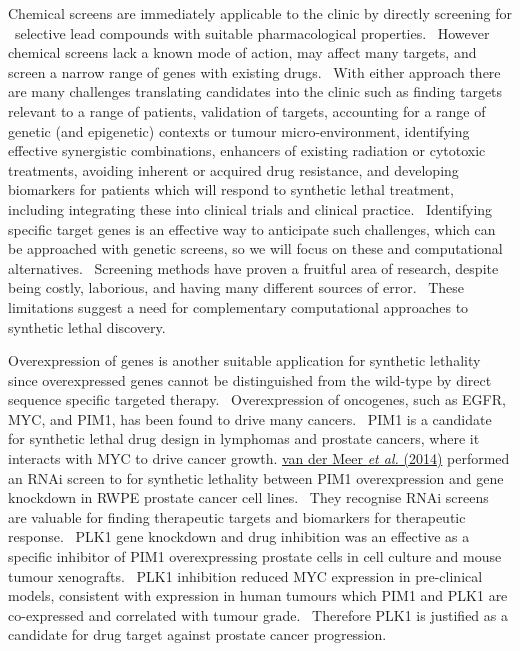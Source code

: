 Chemical screens are immediately applicable to the clinic by directly screening for \ selective lead compounds with suitable pharmacological properties. \ However chemical screens lack a known mode of action, may affect many targets, and screen a narrow range of genes with existing drugs. \ With either approach there are many challenges translating candidates into the clinic such as finding targets relevant to a range of patients, validation of targets, accounting for a range of genetic (and epigenetic) contexts or tumour micro-environment, identifying effective synergistic combinations, enhancers of existing radiation or cytotoxic treatments, avoiding inherent or acquired drug resistance, and developing biomarkers for patients which will respond to synthetic lethal treatment, including integrating these into clinical trials and clinical practice. \ Identifying specific target genes is an effective way to anticipate such challenges, which can be approached with genetic screens, so we will focus on these and computational alternatives. \ Screening methods have proven a fruitful area of research, despite being costly, laborious, and having many different sources of error. \ These limitations suggest a need for complementary computational approaches to synthetic lethal discovery. \  


Overexpression of genes is another suitable application for synthetic lethality since overexpressed genes cannot be distinguished from the wild-type by direct sequence specific targeted therapy. \ Overexpression of oncogenes, such as EGFR, MYC, and PIM1, has been found to drive many cancers. \ PIM1 is a candidate for synthetic lethal drug design in lymphomas and prostate cancers, where it interacts with MYC to drive cancer growth. \hyperlink{ENREF103}{van der Meer}\hyperlink{ENREF103}{\textit{ et al.}}\hyperlink{ENREF103}{ (2014)} performed an RNAi screen to for synthetic lethality between PIM1 overexpression and gene knockdown in RWPE prostate cancer cell lines. \ They recognise RNAi screens are valuable for finding therapeutic targets and biomarkers for therapeutic response. \ PLK1 gene knockdown and drug inhibition was an effective as a specific inhibitor of PIM1 overexpressing prostate cells in cell culture and mouse tumour xenografts. \ PLK1 inhibition reduced MYC expression in pre-clinical models, consistent with expression in human tumours which PIM1 and PLK1 are co-expressed and correlated with tumour grade. \ Therefore PLK1 is justified as a candidate for drug target against prostate cancer progression. \  

